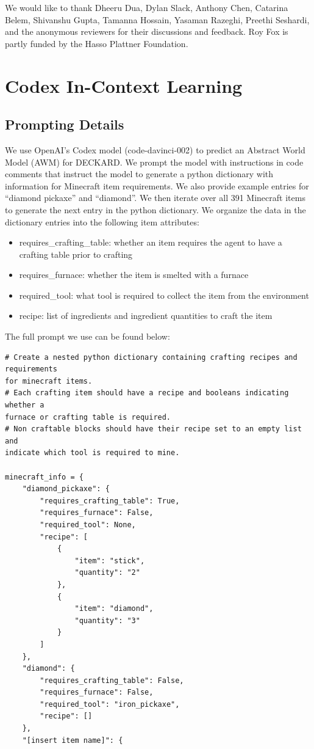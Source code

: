 \documentclass[nohyperref]{article}
\theoremstyle{plain}
\theoremstyle{definition}
\theoremstyle{remark}
\newcommand{\agentshort}{\textsc{DECKARD}}
\begin{document}
We would like to thank Dheeru Dua, Dylan Slack, Anthony Chen, Catarina
Belem, Shivanshu Gupta, Tamanna Hossain, Yasaman Razeghi, Preethi Seshardi, and the anonymous reviewers for their discussions and feedback.
Roy Fox is partly funded by the Hasso Plattner Foundation.




\newpage
\appendix
\onecolumn
\section{Codex In-Context Learning}
\label{app:llm}

\subsection{Prompting Details}

We use OpenAI's Codex model (code-davinci-002) \cite{OpenAICodex} to predict an Abstract World Model (AWM) for \agentshort{}. 
We prompt the model with instructions in code comments that instruct the model to generate a python dictionary with information for Minecraft item requirements.
We also provide example entries for ``diamond pickaxe'' and ``diamond''.
We then iterate over all 391 Minecraft items to generate the next entry in the python dictionary.
We organize the data in the dictionary entries into the following item attributes:

\begin{itemize}
    \item requires\_crafting\_table: whether an item requires the agent to have a crafting table prior to crafting
    \item requires\_furnace: whether the item is smelted with a furnace
    \item required\_tool: what tool is required to collect the item from the environment
    \item recipe: list of ingredients and ingredient quantities to craft the item
\end{itemize}

The full prompt we use can be found below:

\begin{verbatim}
# Create a nested python dictionary containing crafting recipes and requirements 
for minecraft items.
# Each crafting item should have a recipe and booleans indicating whether a 
furnace or crafting table is required.
# Non craftable blocks should have their recipe set to an empty list and 
indicate which tool is required to mine.

minecraft_info = {
    "diamond_pickaxe": {
        "requires_crafting_table": True,
        "requires_furnace": False,
        "required_tool": None,
        "recipe": [
            {
                "item": "stick",
                "quantity": "2"
            },
            {
                "item": "diamond",
                "quantity": "3"
            }
        ]
    },
    "diamond": {
        "requires_crafting_table": False,
        "requires_furnace": False,
        "required_tool": "iron_pickaxe",
        "recipe": []
    },
    "[insert item name]": {
\end{verbatim}
\end{document}
